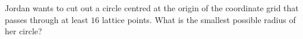 Jordan wants to cut out a circle centred at the origin of the coordinate grid that passes through at least $16$ lattice points. What is the smallest possible radius of her circle?

